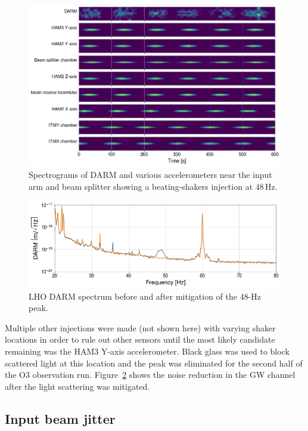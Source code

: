 \begin{figure}
	\centering
	\includegraphics[width=\textwidth]{figures/noise-studies/vib-beat-spectrograms.png}
	\caption{
		Spectrograms of DARM and various accelerometers near the input arm and beam splitter showing a beating-shakers injection at 48\,Hz.}
	\label{fig:vib-beat-spectrograms}
\end{figure}

\begin{figure}
	\centering
	\includegraphics[width=\textwidth]{figures/noise-studies/vib-48Hz.png}
	\caption{LHO DARM spectrum before and after mitigation of the 48-Hz peak.}
	\label{fig:vib-48hz}
\end{figure}

Multiple other injections were made (not shown here) with varying shaker locations in order to rule out other sensors until the most likely candidate remaining was the HAM3 Y-axis accelerometer.
Black glass was used to block scattered light at this location and the peak was eliminated for the second half of the O3 observation run.
Figure~\ref{fig:vib-48hz} shows the noise reduction in the \ac{GW} channel after the light scattering was mitigated.

\subsection{Input beam jitter}\label{sec:vib-jitter}


